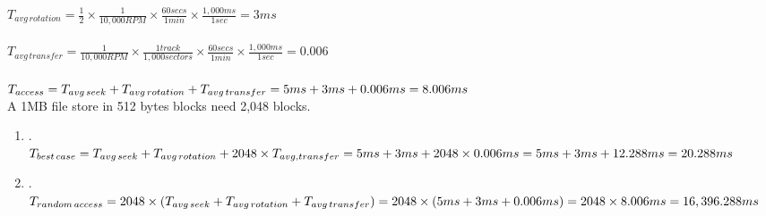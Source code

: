 \documentclass{article}
\begin{document}
$T_{avg\,rotation} = \frac{1}{2} \times \frac{1}{10,000RPM} \times \frac{60secs}{1min} \times
\frac{1,000ms}{1sec} = 3ms$ \\
\\
$T_{avg\,transfer} = \frac{1}{10,000RPM} \times \frac{1track}{1,000sectors} \times
\frac{60secs}{1min} \times \frac{1,000ms}{1sec} = 0.006$ \\
\\
$T_{access} = T_{avg\,seek} + T_{avg\,rotation} + T_{avg\,transfer} \\
= 5ms + 3ms + 0.006ms = 8.006ms$ \\
A 1MB file store in 512 bytes blocks need 2,048 blocks. \\
\begin{enumerate}[label=\textbf{\Alph*.}]
	\item . \\
	$T_{best\,case} = T_{avg\,seek} + T_{avg\,rotation} + 2048 \times T_{avg,transfer} \\
	= 5ms + 3ms + 2048 \times 0.006ms = 5ms + 3ms + 12.288ms = 20.288ms$ \\
	\item . \\
	$T_{random\,access} = 2048 \times (T_{avg\,seek} + T_{avg\,rotation} + T_{avg\,transfer}) \\
	= 2048 \times (5ms + 3ms + 0.006ms) = 2048 \times 8.006ms = 16,396.288ms$ \\
\end{enumerate}
\end{document}
